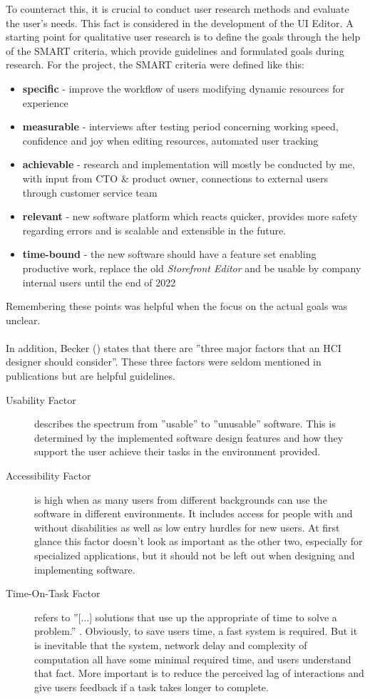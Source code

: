 To counteract this, it is crucial to conduct user research methods and evaluate the user's needs.
This fact is considered in the development of the UI Editor.
A starting point for qualitative user research is to define the goals through the help of the SMART criteria, which provide guidelines and formulated goals during research.
For the project, the SMART criteria were defined like this:
\label{fig:smart}
\begin{itemize}
  \item \textbf{specific} - improve the workflow of users modifying dynamic resources for \Gls{experience}
  \item \textbf{measurable} - interviews after testing period concerning working speed, confidence and joy when editing resources, automated user tracking
  \item \textbf{achievable} - research and implementation will mostly be conducted by me, with input from CTO \& product owner, connections to external users through customer service team
  \item \textbf{relevant} - new software platform which reacts quicker, provides more safety regarding errors and is scalable and extensible in the future.
  \item \textbf{time-bound} - the new software should have a feature set enabling productive work, replace the old \textit{Storefront Editor} and be usable by company internal users until the end of 2022
\end{itemize}
Remembering these points was helpful when the focus on the actual goals was unclear.
\\\\
In addition, Becker (\cite[pp. 37-41]{LearnHCI:2020ys}) states that there are ''three major factors that an HCI designer should consider''.
These three factors were seldom mentioned in publications but are helpful guidelines.
\begin{description}
  \item[Usability Factor] describes the spectrum from ''usable'' to ''unusable'' software. This is determined by the implemented software design features and how they support the user achieve their tasks in the environment provided.
  \item[Accessibility Factor] is high when as many users from different backgrounds can use the software in different environments. 
  It includes access for people with and without disabilities as well as low entry hurdles for new users.
  At first glance this factor doesn't look as important as the other two, especially for specialized applications, but it should not be left out when designing and implementing software.
  \item[Time-On-Task Factor] refers to ''[...] solutions that use up the appropriate of time to solve a problem.'' \Cite[p. 40]{LearnHCI:2020ys}. Obviously, to save users time, a fast system is required.
But it is inevitable that the system, network delay and complexity of computation all have some minimal required time, and users understand that fact. More important is to reduce the perceived lag of interactions and give users feedback if a task takes longer to complete.
\end{description}

